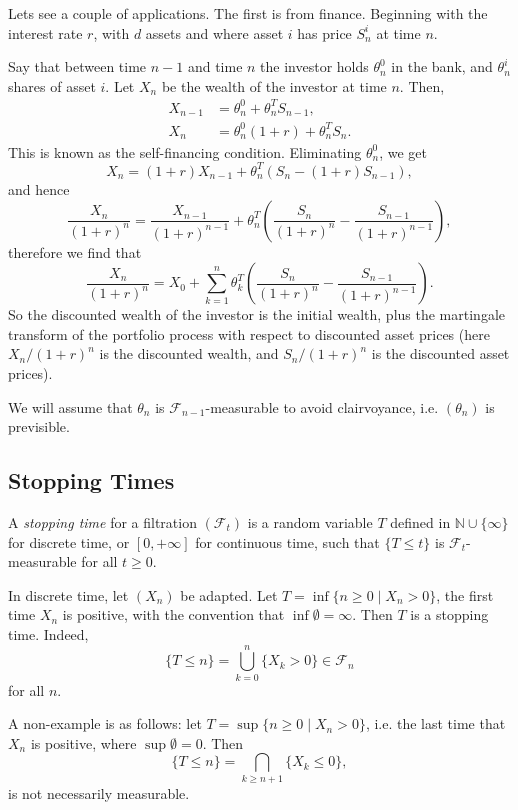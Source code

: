 \documentclass[12pt]{article}
\begin{document}
Lets see a couple of applications. The first is from finance. Beginning with the interest rate $r$, with $d$ assets and where asset $i$ has price $S^i_n$ at time $n$.

Say that between time $n-1$ and time $n$ the investor holds $\theta^0_n$ in the bank, and $\theta^i_n$ shares of asset $i$. Let $X_n$ be the wealth of the investor at time $n$. Then,
\begin{align*}
	X_{n-1} &= \theta^0_n + \theta_n^T S_{n-1}, \\
	X_n &= \theta^0_n(1+r) + \theta_n^T S_n.
\end{align*}
This is known as the self-financing condition. Eliminating $\theta^0_n$, we get
\[
X_n = (1+r)X_{n-1} + \theta_n^T(S_n - (1+r)S_{n-1}),
\]
and hence
\[
\frac{X_n}{(1 + r)^n} = \frac{X_{n-1}}{(1 + r)^{n-1}} + \theta^T_n \left( \frac{S_n}{(1 + r)^n} - \frac{S_{n-1}}{(1 + r)^{n-1}} \right),
\]
therefore we find that
\[
\frac{X_n}{(1 + r)^n} = X_0 + \sum_{k = 1}^n \theta_k^T \left( \frac{S_n}{(1 + r)^n} - \frac{S_{n-1}}{(1 + r)^{n-1}} \right).
\]
So the discounted wealth of the investor is the initial wealth, plus the martingale transform of the portfolio process with respect to discounted asset prices (here $X_n/(1 + r)^n$ is the discounted wealth, and $S_n/(1 + r)^n$ is the discounted asset prices).

We will assume that $\theta_n$ is $\mathcal{F}_{n-1}$-measurable to avoid clairvoyance, i.e. $(\theta_n)$ is previsible.

\subsection{Stopping Times}
\label{sub:stop}

\begin{definition}
	A \emph{stopping time} for a filtration $(\mathcal{F}_t)$ is a random variable $T$ defined in $\mathbb{N} \cup \{\infty\}$ for discrete time, or $[0, +\infty]$ for continuous time, such that $\{T \leq t\}$ is $\mathcal{F}_t$-measurable for all $t \geq 0$.
\end{definition}

\begin{exbox}
	In discrete time, let $(X_n)$ be adapted. Let $T = \inf\{n \geq  0 \mid X_n > 0\}$, the first time $X_n$ is positive, with the convention that $\inf \emptyset = \infty$. Then $T$ is a stopping time. Indeed,
	\[
		\{T \leq n\} = \bigcup_{k = 0}^n \{ X_k > 0 \} \in \mathcal{F}_n
	\]
	for all $n$.

	A non-example is as follows: let $T = \sup\{n \geq 0 \mid X_n > 0\}$, i.e. the last time that $X_n$ is positive, where $\sup \emptyset = 0$. Then
	\[
		\{T \leq n \} = \bigcap_{k \geq n+1} \{X_k \leq 0\},
	\]
	is not necessarily measurable.
\end{exbox}
\end{document}

